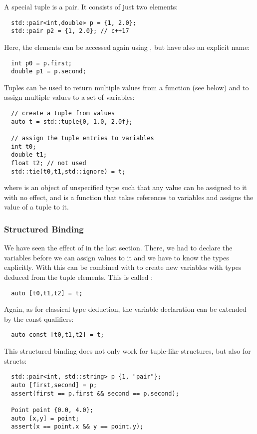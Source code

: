 A special tuple is a pair. It consists of just two elements:
%
\begin{verbatim}
  std::pair<int,double> p = {1, 2.0};
  std::pair p2 = {1, 2.0}; // c++17
\end{verbatim}
%
Here, the elements can be accessed again using , but have also an explicit name:
%
\begin{verbatim}
  int p0 = p.first;
  double p1 = p.second;
\end{verbatim}

Tuples can be used to return multiple values from a function (see below) and to assign multiple values to a set of
variables:
%
\begin{verbatim}
  // create a tuple from values
  auto t = std::tuple{0, 1.0, 2.0f};

  // assign the tuple entries to variables
  int t0;
  double t1;
  float t2; // not used
  std::tie(t0,t1,std::ignore) = t;
\end{verbatim}
%
where  is an object of unspecified type such that any value can be assigned to it with no effect, and  is a function that takes references to variables and assigns the value of a tuple to it.


\subsubsection{Structured Binding}
We have seen the effect of  in the last section. There, we had to declare the variables before we can assign values to it and we have to know the types explicitly. With\marginpar{[\cxx{17}]}  this can be combined with  to create new variables with types deduced from the tuple elements. This is called :
%
\begin{verbatim}
  auto [t0,t1,t2] = t;
\end{verbatim}
%
Again, as for classical  type deduction, the variable declaration can be extended by the const qualifiers:
%
\begin{verbatim}
  auto const [t0,t1,t2] = t;
\end{verbatim}


This structured binding does not only work for tuple-like structures, but also for structs:
%
\begin{verbatim}
  std::pair<int, std::string> p {1, "pair"};
  auto [first,second] = p;
  assert(first == p.first && second == p.second);

  Point point {0.0, 4.0};
  auto [x,y] = point;
  assert(x == point.x && y == point.y);
\end{verbatim}

